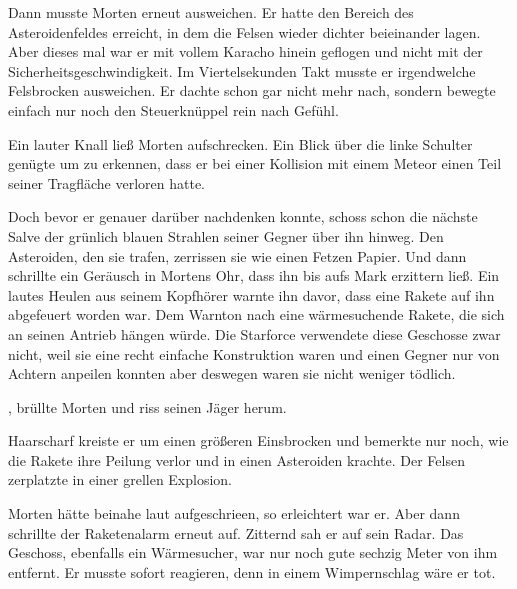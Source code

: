 \par

Dann musste Morten erneut ausweichen. Er hatte den Bereich des Asteroidenfeldes erreicht, in dem die Felsen wieder dichter beieinander lagen. Aber dieses mal war er mit vollem Karacho hinein geflogen und nicht mit der Sicherheitsgeschwindigkeit. Im Viertelsekunden Takt musste er irgendwelche Felsbrocken ausweichen. Er dachte schon gar nicht mehr nach, sondern bewegte einfach nur noch den Steuerknüppel rein nach Gefühl.

\par

Ein lauter Knall ließ Morten aufschrecken. Ein Blick über die linke Schulter genügte um zu erkennen, dass er bei einer Kollision mit einem Meteor einen Teil seiner Tragfläche verloren hatte.

\par

Doch bevor er genauer darüber nachdenken konnte, schoss schon die nächste Salve der grünlich blauen Strahlen seiner Gegner über ihn hinweg. Den Asteroiden, den sie trafen, zerrissen sie wie einen Fetzen Papier. Und dann schrillte ein Geräusch in Mortens Ohr, dass ihn bis aufs Mark erzittern ließ. Ein lautes Heulen aus seinem Kopfhörer warnte ihn davor, dass eine Rakete auf ihn abgefeuert worden war. Dem Warnton nach eine wärmesuchende Rakete, die sich an seinen Antrieb hängen würde. Die Starforce verwendete diese Geschosse zwar nicht, weil sie eine recht einfache Konstruktion waren und einen Gegner nur von Achtern anpeilen konnten aber deswegen waren sie nicht weniger tödlich.

\par

, brüllte Morten und riss seinen Jäger herum.

\par

Haarscharf kreiste er um einen größeren Einsbrocken und bemerkte nur noch, wie die Rakete ihre Peilung verlor und in einen Asteroiden krachte. Der Felsen zerplatzte in einer grellen Explosion.

\par

Morten hätte beinahe laut aufgeschrieen, so erleichtert war er. Aber dann schrillte der Raketenalarm erneut auf. Zitternd sah er auf sein Radar. Das Geschoss, ebenfalls ein Wärmesucher, war nur noch gute sechzig Meter von ihm entfernt. Er musste sofort reagieren, denn in einem Wimpernschlag wäre er tot.

